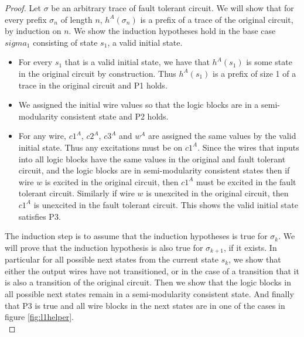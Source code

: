 \documentclass[12pt]{report}
\begin{document}
\begin{proof}
Let $\sigma$ be an arbitrary trace of fault tolerant circuit.  We will show that for every prefix $\sigma_n$ of length $n$, $h^A(\sigma_n)$ is a prefix of a trace of the original circuit, by induction on $n$.
We show the induction hypotheses hold in the base case $sigma_1$ consisting of state $s_1$, a valid initial state.
\begin{itemize}
\item For every $s_1$ that is a valid initial state, we have that $h^A(s_1)$ is some state in the original circuit by construction.  Thus $h^A(s_1)$ is a prefix of size 1 of a trace in the original circuit and P1 holds.
\item We assigned the initial wire values so that the logic blocks are in a semi-modularity consistent state and P2 holds.
\item 
For any wire, $c1^A$, $c2^A$, $c3^A$ and $w^A$ are assigned the same values by the valid initial state.  Thus any excitations must be on $c1^A$. Since the wires that inputs into all logic blocks have the same values in the original and fault tolerant circuit, and the logic blocks are in semi-modularity consistent states then if wire $w$ is excited in the original circuit, then $c1^A$ must be excited in the fault tolerant circuit.  Similarly if wire $w$ is unexcited in the original circuit, then $c1^A$ is unexcited in the fault tolerant circuit.  
This shows the valid initial state satisfies P3.    %
\end{itemize}

The induction step is to assume that the induction hypotheses is true for $\sigma_k$.  We will prove that the induction hypothesis is also true for $\sigma_{k+1}$, if it exists.  In particular for all possible next states from the current state $s_k$, we show that either the output wires have not transitioned, or in the case of a transition that it is also a transition of the original circuit.  Then we show that the logic blocks in all possible next states remain in a semi-modularity consistent state.  And finally that P3 is true and all wire blocks in the next states are in one of the cases in figure \ref{fig:l1helper}.\\



\end{proof}
\end{document}
